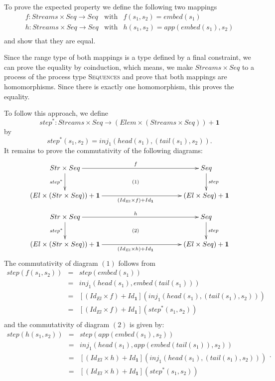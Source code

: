 \documentclass[landscape, autoslides, light]{mmiss}
\begin{document}
\begin{Package}[Label={FSDPT}, Title={Formal Specification of Data and Process Types}, ShortTitle={FSDPT}, Authors={Horst Reichel}, Date={February 2003}, LevelOfDetail=Lecture, Language=en-GB]
\begin{Section}[Title={Final Coalgebras as Process Types}, Label={section4}]
\begin{Section}[Title={Coinduction}, Label={section4_3}]
\begin{Paragraph}[Title={Coinductive Proofs}, Label=Paragraph128]
To prove the expected property we define the following two
mappings
$$\begin{array}{lll}
f : Streams \times Seq \to Seq & \mbox{with} & f(s_1,s_2) =
embed(s_1) \\
h : Streams \times Seq \to Seq & \mbox{with} & h(s_1,s_2) =
app(embed(s_1),s_2) \\ \end{array}$$ and show that they are
equal.\pause

Since the range type of both mappings is a type defined by a final
constraint, we can prove the equality by coinduction, which means,
we make $Streams \times Seq$ to a process of the process type
\textsc{Sequences} and prove that both mappings are homomorphisms.
Since there is exactly one homomorphism, this proves the equality.

To follow this approach, we define $$step^* : Streams \times Seq
\to (Elem \times (Streams \times Seq)) + \mathbf{1}$$ by
$$step^*(s_1,s_2) = inj_1(head(s_1),(tail(s_1),s_2)).$$
It remains to prove the commutativity of the following diagrams:
$$ \xymatrix{\ar @{} [drrrr] | {(1)}
Str \times Seq \ar[d]_{step^*} \ar[rrrr]^f & & & & Seq \ar[d]^{step} \\
(El \times (Str \times Seq)) + \mathbf{1} \ar[rrrr]_{(Id_{El}
\times f) + Id_{\mathbf{1}}} & & & & (El\times Seq) + \mathbf{1}
}$$
$$\xymatrix{\ar @{} [drrrr] | {(2)}
Str \times Seq \ar[d]_{step^*} \ar[rrrr]^h & & & &  Seq \ar[d]^{step} \\
(El \times (Str \times Seq)) + \mathbf{1} \ar[rrrr]_{(Id_{El}
\times h) + Id_{\mathbf{1}}} & & & & (El\times Seq) + \mathbf{1}
}$$ The commutativity of diagram $(1)$ follows from
$$\begin{array}{lll}
step(f(s_1,s_2)) & = & step(embed(s_1)) \\
 & =  & inj_1(head(s_1), embed(tail(s_1))) \\
 & = & [(Id_{El} \times f) + Id_{\mathbf{1}}]
 (inj_1(head(s_1),(tail(s_1),s_2))) \\
 & = &  [(Id_{El} \times f) + Id_{\mathbf{1}}](step^*(s_1,s_2))
 \\ \end{array}$$
  and the commutativity of diagram $(2)$ is given by:
$$\begin{array}{lll}
step(h(s_1,s_2)) & = & step(app(embed(s_1),s_2)) \\
 & = & inj_1(head(s_1), app(embed(tail(s_1)),s_2)) \\
  & = & [(Id_{El} \times h) +
  Id_{\mathbf{1}}](inj_1(head(s_1),(tail(s_1),s_2)))\\
   & = & [(Id_{El} \times h) + Id_{\mathbf{1}}](step^*(s_1,s_2))
 \\ \end{array}.$$


\end{Paragraph}
\end{Section}
\end{Section}
\end{Package}
\end{document}
